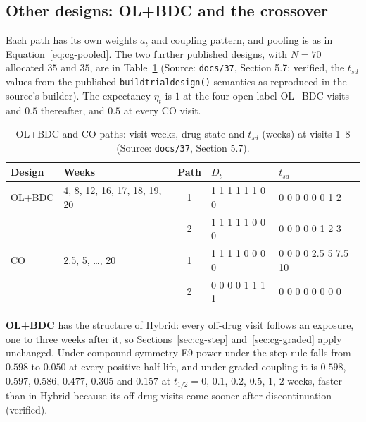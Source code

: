 \documentclass[11pt]{article}
\newcommand{\code}[1]{\texttt{#1}}
\begin{document}
\subsection{Other designs: OL+BDC and the crossover}
\label{sec:inve-cg-designs}

Each path has its own weights $a_t$ and coupling pattern, and pooling
is as in Equation~\eqref{eq:cg-pooled}. The two further published
designs, with $N = 70$ allocated $35$ and $35$, are in
Table~\ref{tab:inve-designs} (Source: \code{docs/37}, Section 5.7;
verified, the $t_{sd}$ values from the published
\code{buildtrialdesign()} semantics as reproduced in the source's
builder). The expectancy $\eta_t$ is $1$ at the four open-label OL+BDC
visits and $0.5$ thereafter, and $0.5$ at every CO visit.

\begin{table}[h]
\centering\small
\caption{OL+BDC and CO paths: visit weeks, drug state and $t_{sd}$
(weeks) at visits 1--8 (Source: \code{docs/37}, Section 5.7).}
\label{tab:inve-designs}
\begin{tabular}{@{}llcll@{}}
\toprule
Design & Weeks & Path & $D_t$ & $t_{sd}$ \\
\midrule
OL+BDC & 4, 8, 12, 16, 17, 18, 19, 20 & 1 & 1 1 1 1 1 1 0 0 & 0 0 0 0 0 0 1 2 \\
       &                              & 2 & 1 1 1 1 1 0 0 0 & 0 0 0 0 0 1 2 3 \\
CO     & 2.5, 5, \ldots, 20           & 1 & 1 1 1 1 0 0 0 0 & 0 0 0 0 2.5 5 7.5 10 \\
       &                              & 2 & 0 0 0 0 1 1 1 1 & 0 0 0 0 0 0 0 0 \\
\bottomrule
\end{tabular}
\end{table}

\textbf{OL+BDC} has the structure of Hybrid: every off-drug visit
follows an exposure, one to three weeks after it, so
Sections~\ref{sec:cg-step} and~\ref{sec:cg-graded} apply unchanged.
Under compound symmetry E9 power under the step rule falls from $0.598$
to $0.050$ at every positive half-life, and under graded coupling it is
$0.598$, $0.597$, $0.586$, $0.477$, $0.305$ and $0.157$ at
$t_{1/2} = 0$, $0.1$, $0.2$, $0.5$, $1$, $2$ weeks, faster than in
Hybrid because its off-drug visits come sooner after discontinuation
(verified).
\end{document}
